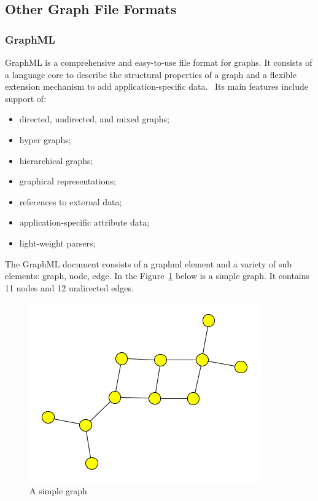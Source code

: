\documentclass[a4paper,oneside]{article}
\begin{document}
\subsection{Other Graph File Formats}

\subsubsection{GraphML}
GraphML is a comprehensive and easy-to-use file format for graphs. It consists of a language core to describe the structural properties of a graph and a flexible extension mechanism to add application-specific data.~\cite{GraphML} Its main features include support of:
\begin{itemize}
\item directed, undirected, and mixed graphs;
\item hyper graphs;
\item hierarchical graphs;
\item graphical representations;
\item references to external data;
\item application-specific attribute data;
\item light-weight parsers;
\end{itemize}

The GraphML document consists of a graphml element and a variety of sub elements: graph, node, edge. In the Figure~\ref{simple_graphml} below is a simple graph. It contains 11 nodes and 12 undirected edges. 

\begin{center}
\begin{figure}
	\includegraphics[scale=1.0]{pictures/simple.png}
	\caption{A simple graph}
	\label{simple_graphml}
\end{figure}
\end{center}
\end{document}
